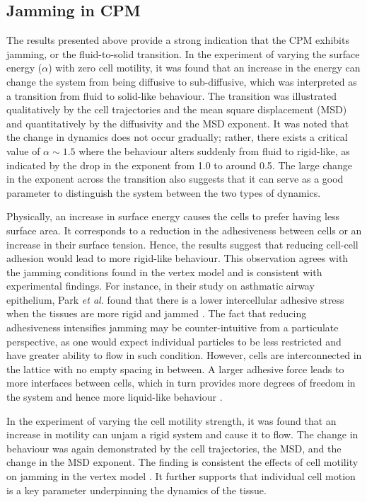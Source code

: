 \documentclass[a4paper,12pt]{article}
\begin{document}
\subsection{Jamming in CPM}
\label{sec:jammingincpm}
The results presented above provide a strong indication that the CPM exhibits jamming, or the fluid-to-solid transition. In the experiment of varying the surface energy ($\alpha$) with zero cell motility, it was found that an increase in the energy can change the system from being diffusive to sub-diffusive, which was interpreted as a transition from fluid to solid-like behaviour. The transition was illustrated qualitatively by the cell trajectories and the mean square displacement (MSD) and quantitatively by the diffusivity and the MSD exponent. It was noted that the change in dynamics does not occur gradually; rather, there exists a critical value of $\alpha \sim 1.5$ where the behaviour alters suddenly from fluid to rigid-like, as indicated by the drop in the exponent from 1.0 to around 0.5. The large change in the exponent across the transition also suggests that it can serve as a good parameter to distinguish the system between the two types of dynamics. 

Physically, an increase in surface energy causes the cells to prefer having less surface area. It corresponds to a reduction in the adhesiveness between cells or an increase in their surface tension. Hence, the results suggest that reducing cell-cell adhesion would lead to more rigid-like behaviour. This observation agrees with the jamming conditions found in the vertex model \cite{bi2015density, bi2015motility} and is consistent with experimental findings. For instance, in their study on asthmatic airway epithelium, Park \emph{et al.} found that there is a lower intercellular adhesive stress when the tissues are more rigid and jammed \cite{park2015}.  The fact that reducing adhesiveness intensifies jamming may be counter-intuitive from a particulate perspective, as one would expect individual particles to be less restricted and have greater ability to flow in such condition.  However, cells are interconnected in the lattice with no empty spacing in between. A larger adhesive force leads to more interfaces between cells, which in turn provides more degrees of freedom in the system and hence more liquid-like behaviour \cite{bi2015density}. 

In the experiment of varying the cell motility strength, it was found that an increase in motility can unjam a rigid system and cause it to flow. The change in behaviour was again demonstrated by the cell trajectories, the MSD, and the change in the MSD exponent. The finding is consistent the effects of cell motility on jamming in the vertex model \cite{bi2015motility}. It further supports that individual cell motion is a key parameter underpinning the dynamics of the tissue. 
\end{document}

